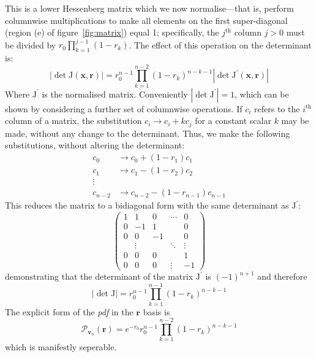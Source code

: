 \documentclass[aps,prl,twocolumn]{revtex4}
\renewcommand{\vec}[1]{\mathbf{#1}}
\newcommand{\mat}[1]{\mathrm{#1}}
\newcommand{\of}[1]{\!\left(#1\right)}
\newcommand{\pdf}{{\it pdf}}
\newcommand{\abs}[1]{\left|#1\right|}
\newcommand{\prob}[1]{\mathcal{#1}}
\begin{document}
This is a lower Hessenberg matrix which we now normalise---that is, perform
columnwise multiplications to make all elements on the first super-diagonal
(region (e) of figure~\ref{fig:matrix}) equal 1;
specifically, the \(j^{\text{th}}\) column \( j>0 \) must be divided by \( r_0
\prod_{k=1}^{j-1} \left( 1-r_k \right) \). The effect of this operation on the
determinant is:
\begin{equation}
  \abs{ \det \mat{J} \of{ \vec{x}, \vec{r} }} = r_0^{n-1} \prod_{k=1}^{n-2}
  \left( 1-r_k \right)^{n-k-1} \abs{ \det \mat{J}^{\prime} \of{ \vec{x}, \vec{r}
  } }
\end{equation}
Where \( \mat{J}^{\prime} \) is the normalised matrix. Conveniently \( \abs{
\det \mat{J}^{\prime} }=1 \), which can be shown by considering a further set of
columnwise operations. If \( c_i \) refers to the \( i^{\text{th}} \) column of
a matrix, the substitution \( c_i \rightarrow c_i + k c_j \) for a constant
scalar \(k\) may be made, without any change to the determinant. Thus, we make
the following substitutions, without altering the determinant:
\begin{align*}
  c_0 &\rightarrow c_0 + \left( 1-r_1 \right) c_1 \\
  c_1 &\rightarrow c_1 - \left( 1-r_2 \right) c_2 \\
  \vdots \\
  c_{n-2} &\rightarrow c_{n-2} - \left( 1-r_{n-1} \right) c_{n-1}
\end{align*}
This reduces the matrix to a bidiagonal form with the same determinant as \(
\mat{J}^{\prime} \):
\begin{equation*}
  \begin{pmatrix}
    1 & 1 & 0 & \cdots & 0 \\
    0 & -1 & 1 & & 0 \\
    0 & 0 & -1 & & 0 \\
    & \vdots & & \ddots & \vdots \\
    0 & 0 & 0 & & 1 \\
    0 & 0 & 0 & \vdots & -1 
  \end{pmatrix}
\end{equation*}
demonstrating that the determinant of the matrix \( \mat{J}^{\prime} \) is \(
\left( -1 \right)^{n+1} \) and therefore
\begin{equation}
  \abs{ \det \mat{J} } = r_0^{n-1} \prod_{k=1}^{n-1} \left( 1-r_k
  \right)^{n-k-1}
\end{equation}
The explicit form of the \pdf{} in the \(\vec{r}\) basis is
\begin{equation}
  \prob{P}_{\vec{v}_n} \of{ \vec{r} } = e^{-r_0} r_0^{n-1} \prod_{k=1}^{n-2}
  \left( 1-r_k \right)^{n-k-1}
\end{equation}
which is manifestly seperable.
\end{document}
